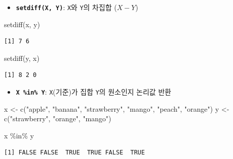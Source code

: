 \documentclass[
  11pt,
]{krantz}
\newenvironment{Shaded}{\begin{snugshade}}{\end{snugshade}}
\newcommand{\FunctionTok}[1]{\textcolor[rgb]{0,0,0}{#1}}
\newcommand{\NormalTok}[1]{#1}
\newcommand{\OtherTok}[1]{\textcolor[rgb]{0.37,0.37,0.37}{#1}}
\newcommand{\SpecialCharTok}[1]{\textcolor[rgb]{0,0,0}{#1}}
\newcommand{\StringTok}[1]{\textcolor[rgb]{0.5,0.5,0.5}{#1}}
\providecommand{\tightlist}{%
  \setlength{\itemsep}{0pt}\setlength{\parskip}{0pt}}
\begin{document}
\normalsize

\begin{itemize}
\tightlist
\item
  \textbf{\texttt{setdiff(X,\ Y)}}: \texttt{X}와 \texttt{Y}의 차집합 (\(X - Y\))
\end{itemize}

\footnotesize

\begin{Shaded}
\begin{Highlighting}[]
\FunctionTok{setdiff}\NormalTok{(x, y)}
\end{Highlighting}
\end{Shaded}

\begin{verbatim}
[1] 7 6
\end{verbatim}

\begin{Shaded}
\begin{Highlighting}[]
\FunctionTok{setdiff}\NormalTok{(y, x)}
\end{Highlighting}
\end{Shaded}

\begin{verbatim}
[1] 8 2 0
\end{verbatim}

\normalsize

\begin{itemize}
\tightlist
\item
  \textbf{\texttt{X\ \%in\%\ Y}}: \texttt{X}(기준)가 집합 \texttt{Y}의 원소인지 논리값 반환
\end{itemize}

\footnotesize

\begin{Shaded}
\begin{Highlighting}[]
\NormalTok{x }\OtherTok{\textless{}{-}} \FunctionTok{c}\NormalTok{(}\StringTok{"apple"}\NormalTok{, }\StringTok{"banana"}\NormalTok{, }\StringTok{"strawberry"}\NormalTok{, }\StringTok{"mango"}\NormalTok{, }\StringTok{"peach"}\NormalTok{, }\StringTok{"orange"}\NormalTok{)}
\NormalTok{y }\OtherTok{\textless{}{-}} \FunctionTok{c}\NormalTok{(}\StringTok{"strawberry"}\NormalTok{, }\StringTok{"orange"}\NormalTok{, }\StringTok{"mango"}\NormalTok{)}

\NormalTok{x }\SpecialCharTok{\%in\%}\NormalTok{ y}
\end{Highlighting}
\end{Shaded}

\begin{verbatim}
[1] FALSE FALSE  TRUE  TRUE FALSE  TRUE
\end{verbatim}
\end{document}
